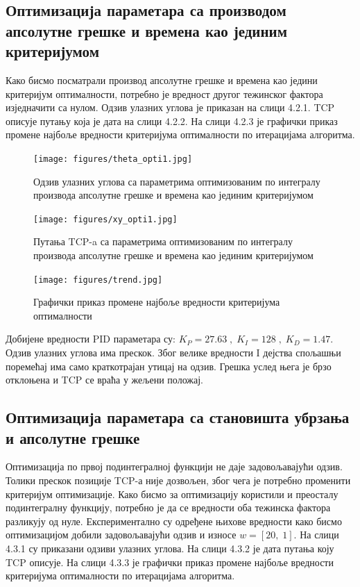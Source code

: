 \documentclass[12pt]{article}
\begin{document}
\subsection{Оптимизација параметара са производом апсолутне грешке и времена као јединим критеријумом}
Како бисмо посматрали производ апсолутне грешке и времена као једини критеријум оптималности, потребно је вредност другог тежинског фактора изједначити са нулом. \newline Одзив улазних углова је приказан на слици 4.2.1. TCP описује путању која је дата на слици 4.2.2. На слици 4.2.3 је графички приказ промене најбоље вредности критеријума оптималности по итерацијама алгоритма.

\begin{figure}[H]
    \centering
    \texttt{[image: figures/theta\_opti1.jpg]}
    \caption{Одзив улазних углова са параметрима оптимизованим по интегралу производа апсолутне грешке и времена као јединим критеријумом}
    \label{fig:w1_0_0_theta}
\end{figure}
\begin{figure}[H]
    \centering
    \texttt{[image: figures/xy\_opti1.jpg]}
    \caption{Путања TCP-a са параметрима оптимизованим по интегралу производа апсолутне грешке и времена као јединим критеријумом}
    \label{fig:w1_0_0_xy}
\end{figure}
\begin{figure}[H]
    \centering
    \texttt{[image: figures/trend.jpg]}
    \caption{Графички приказ промене најбоље вредности критеријума оптималности}
    \label{fig:trend_1}
\end{figure}
Добијене вредности PID параметара су: $K_P=27.63\;,\;K_I=128\;,\;K_D=1.47$. Одзив улазних углова има прескок. Због велике вредности I дејства спољашњи поремећај има само краткотрајан утицај на одзив. Грешка услед њега је брзо отклоњена и TCP се враћа у жељени положај.

\subsection{Оптимизација параметара са становишта убрзања и апсолутне грешке}
Оптимизација по првој подинтегралној функцији не даје задовољавајући одзив. Толики прескок позиције TCP-а није дозвољен, због чега је потребно променити критеријум оптимизације.
Како бисмо за оптимизацију користили и преосталу подинтегралну функцију, потребно је да се вредности оба тежинска фактора разликују од нуле. Експериментално су одређене њихове вредности како бисмо оптимизацијом добили задовољавајући одзив и износе $w=[20,\; 1]$. На слици 4.3.1 су приказани одзиви улазних углова. На слици 4.3.2 је дата путања коју TCP описује. На слици 4.3.3 је графички приказ промене најбоље вредности критеријума оптималности по итерацијама алгоритма.
\end{document}
